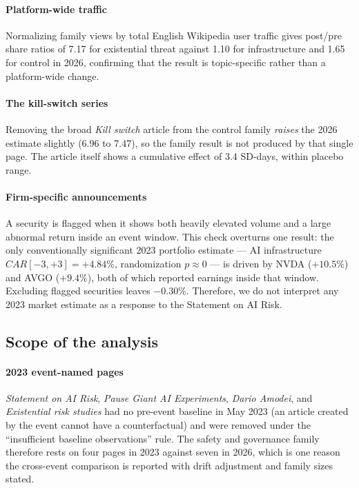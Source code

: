 \elsevierclasstrue\documentclass[preprint,12pt]{elsarticle}%
\begin{document}
\paragraph{Platform-wide traffic} Normalizing family views by total English Wikipedia user traffic gives post/pre share ratios of 7.17 for existential threat against 1.10 for infrastructure and 1.65 for control in 2026, confirming that the result is topic-specific rather than a platform-wide change.

\paragraph{The kill-switch series} Removing the broad \emph{Kill switch} article from the control family \emph{raises} the 2026 estimate slightly (6.96 to 7.47), so the family result is not produced by that single page. The article itself shows a cumulative effect of 3.4 SD-days, within placebo range.

\paragraph{Firm-specific announcements} A security is flagged when it shows both heavily elevated volume and a large abnormal return inside an event window. This check overturns one result: the only conventionally significant 2023 portfolio estimate --- AI infrastructure $CAR[-3,+3]=+4.84\%$, randomization $p\approx 0$ --- is driven by NVDA ($+10.5\%$) and AVGO ($+9.4\%$), both of which reported earnings inside that window. Excluding flagged securities leaves $-0.30\%$. Therefore, we do not interpret any 2023 market estimate as a response to the Statement on AI Risk.


\subsection{Scope of the analysis}
\label{sec:scope}

\paragraph{2023 event-named pages} \emph{Statement on AI Risk}, \emph{Pause Giant AI Experiments}, \emph{Dario Amodei}, and \emph{Existential risk studies} had no pre-event baseline in May 2023 (an article created by the event cannot have a counterfactual) and were removed under the ``insufficient baseline observations'' rule. The safety and governance family therefore rests on four pages in 2023 against seven in 2026, which is one reason the cross-event comparison is reported with drift adjustment and family sizes stated.
\end{document}
